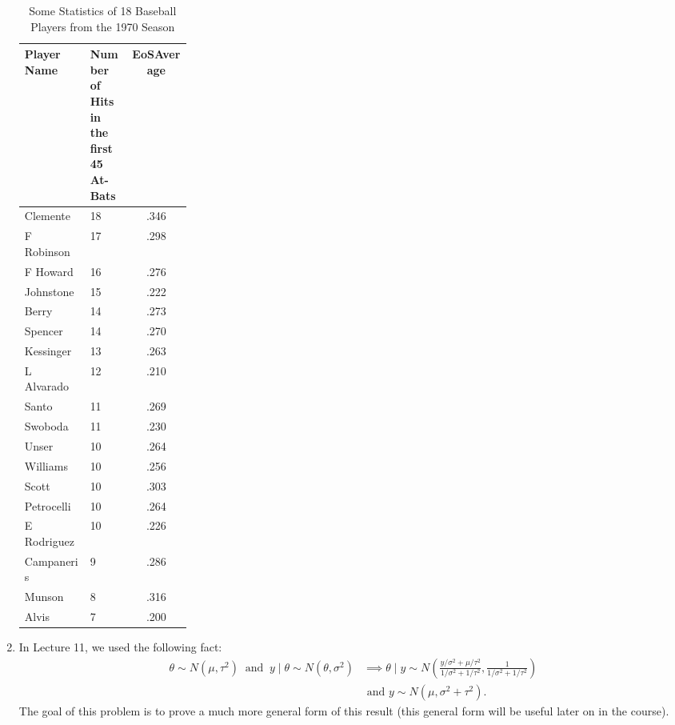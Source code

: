 \documentclass{scrartcl}
\begin{document}
\begin{enumerate}
\begin{table}[H]
\centering
\begin{tabular}{|l|p{0.25\linewidth}|c|}
\hline
\textbf{Player Name} & \textbf{Number of Hits in the first 45 At-Bats} & \textbf{EoSAverage} \\
\hline
Clemente     & 18 & .346 \\
F Robinson   & 17 & .298 \\
F Howard     & 16 & .276 \\
Johnstone    & 15 & .222 \\
Berry        & 14 & .273 \\
Spencer      & 14 & .270 \\
Kessinger    & 13 & .263 \\
L Alvarado   & 12 & .210 \\
Santo        & 11 & .269 \\
Swoboda      & 11 & .230 \\
Unser        & 10 & .264 \\
Williams     & 10 & .256 \\
Scott        & 10 & .303 \\
Petrocelli   & 10 & .264 \\
E Rodriguez  & 10 & .226 \\
Campaneris   & 9  & .286 \\
Munson       & 8  & .316 \\
Alvis        & 7  & .200 \\
\hline
\end{tabular}
\caption{Some Statistics of 18 Baseball Players from the 1970 Season}
\label{tab:player_stats}
\end{table}


\item In Lecture 11, we used the following fact:
  \begin{equation}\label{norm_lik}
    \begin{split}
  \theta \sim N(\mu, \tau^2) ~ \text{ and } ~ y \mid \theta \sim
  N(\theta, \sigma^2) &\implies \theta \mid y \sim N
  \left(\frac{y/\sigma^2 + \mu/\tau^2}{1/\sigma^2 + 1/\tau^2},
  \frac{1}{1/\sigma^2 + 1/\tau^2} \right) \\ &\text{ and } y \sim N(\mu,
                                               \sigma^2 + \tau^2).
  \end{split}                                               
\end{equation}
The goal of this problem is to prove a much more general form of this
result (this general form will be useful later on in the course).


\end{enumerate}
\end{document}
